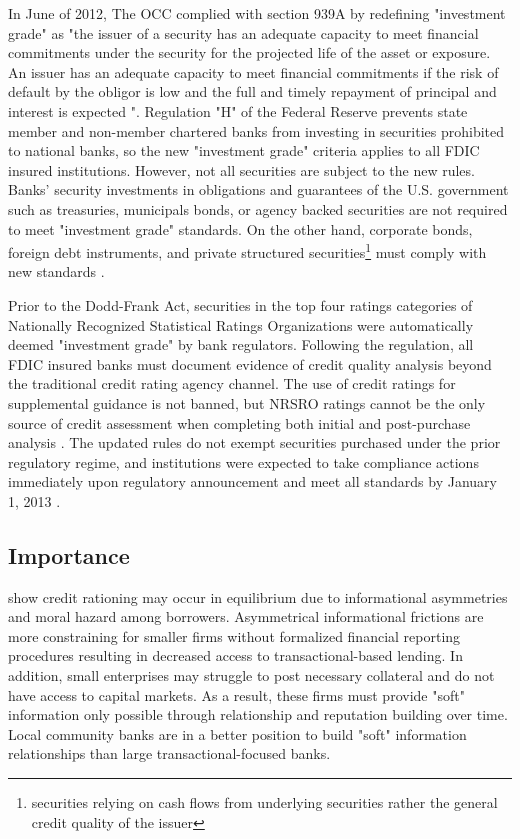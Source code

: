 \documentclass[preprint,12pt]{elsarticle}
\begin{document}
In June of 2012, The OCC complied with section 939A by redefining "investment grade" as "the issuer of a security has an adequate capacity to meet financial commitments under the security for the projected life of the asset or exposure. An issuer has an adequate capacity to meet financial commitments if the risk of default by the obligor is low and the full and timely repayment of principal and interest is expected \citep{eCFRTitle12}".  Regulation "H" of the Federal Reserve prevents state member and non-member chartered banks from investing in securities prohibited to national banks, so the new "investment grade" criteria applies to all FDIC insured institutions.  However, not all securities are subject to the new rules.  Banks' security investments in obligations and guarantees of the U.S. government such as treasuries, municipals bonds, or agency backed securities are not required to meet "investment grade" standards. On the other hand, corporate bonds, foreign debt instruments, and private structured securities\footnote{securities relying on cash flows from underlying securities rather the general credit quality of the issuer} must comply with new standards \citep{Reither2013}.  

Prior to the Dodd-Frank Act, securities in the top four ratings categories of Nationally Recognized Statistical Ratings Organizations were automatically deemed "investment grade" by bank regulators. Following the regulation, all FDIC insured banks must document evidence of credit quality analysis beyond the traditional credit rating agency channel. The use of credit ratings for supplemental guidance is not banned, but NRSRO ratings cannot be the only source of credit assessment when completing both initial and post-purchase analysis \citep{Curry2012}.  The updated rules do not exempt securities purchased under the prior regulatory regime, and institutions were expected to take compliance actions immediately upon regulatory announcement and meet all standards by January 1, 2013 \citep{FDICBoard}. 

\subsection{Importance}
\citet{Stiglitz1981} show credit rationing may occur in equilibrium due to informational asymmetries and moral hazard among borrowers.  Asymmetrical informational frictions are more constraining for smaller firms without formalized financial reporting procedures resulting in decreased access to transactional-based lending.  In addition, small enterprises may struggle to post necessary collateral and do not have access to capital markets.  As a result, these firms must provide "soft" information only possible through relationship and reputation building over time.  Local community banks are in a better position to build "soft" information relationships than large transactional-focused banks.
\end{document}
